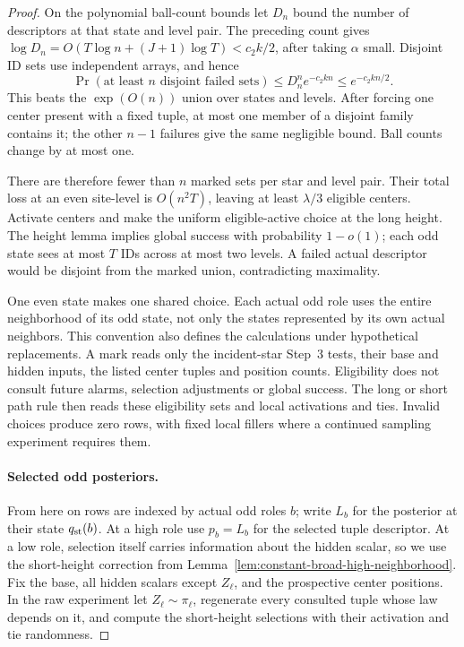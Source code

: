 \begin{proof}
On the polynomial ball-count bounds let \(D_n\) bound the number of
descriptors at that state and level pair. The preceding count gives
\(\log D_n=O(T\log n+(J+1)\log T)<c_2k/2\), after taking
\(\alpha\) small. Disjoint ID sets use independent arrays, and hence
\[
 \Pr(\text{at least }n\text{ disjoint failed sets})
 \le D_n^n e^{-c_2kn}\le e^{-c_2kn/2}.
\]
This beats the \(\exp(O(n))\) union over states and levels.
After forcing one center present with a fixed tuple, at most one member
of a disjoint family contains it; the other \(n-1\) failures give the
same negligible bound. Ball counts change by at most one.

There are therefore fewer than \(n\) marked sets per star and level
pair. Their total loss at an even site-level is \(O(n^2T)\), leaving
at least \(\lambda/3\) eligible centers. Activate centers and make the
uniform eligible-active choice at the long height. The height lemma
implies global success with probability \(1-o(1)\); each odd state sees
at most \(T\) IDs across at most two levels. A failed actual descriptor
would be disjoint from the marked union, contradicting maximality.

One even state makes one shared choice. Each actual odd role uses the
entire neighborhood of its odd state, not only the states represented by
its own actual neighbors. This convention also defines the calculations
under hypothetical replacements. A mark reads only the incident-star
Step~3 tests, their base and hidden inputs, the listed center tuples and
position counts. Eligibility does not consult future alarms, selection
adjustments or global success. The long or short path rule then reads
these eligibility sets and local activations and ties. Invalid choices
produce zero rows, with fixed local fillers where a continued sampling
experiment requires them.

\paragraph{Selected odd posteriors.}
From here on rows are indexed by actual odd roles \(b\); write
\(L_b\) for the posterior at their state \(q_{\rm st}(b)\).
At a high role use \(p_b=L_b\) for the selected tuple descriptor. At a low role, selection itself carries
information about the hidden scalar, so we use the short-height
correction from Lemma~\ref{lem:constant-broad-high-neighborhood}.
Fix the base, all hidden scalars except \(Z_\ell\), and the prospective
center positions. In the raw experiment let \(Z_\ell\sim\pi_\ell\),
regenerate every consulted tuple whose law depends on it, and compute the
short-height selections with their activation and tie randomness.


\end{proof}
